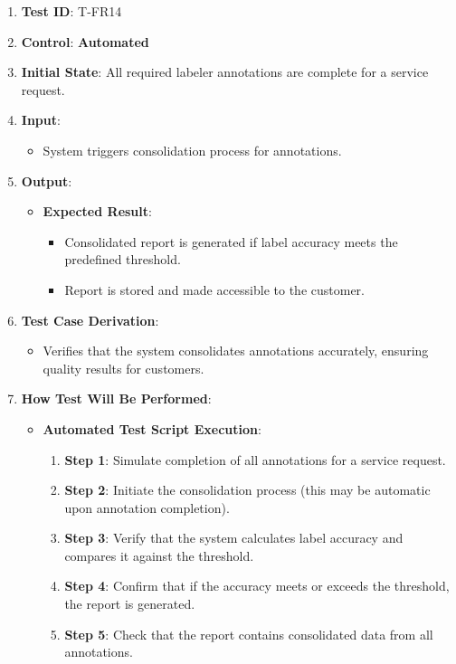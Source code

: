 \documentclass[12pt, titlepage]{article}
\begin{document}
\begin{enumerate}
    \item \textbf{Test ID}: T-FR14
    \item \textbf{Control}: \textbf{Automated}
    \item \textbf{Initial State}: All required labeler annotations are complete for a service request.
    \item \textbf{Input}:
    \begin{itemize}
        \item System triggers consolidation process for annotations.
    \end{itemize}
    \item \textbf{Output}:
    \begin{itemize}
        \item \textbf{Expected Result}:
        \begin{itemize}
            \item Consolidated report is generated if label accuracy meets the predefined threshold.
            \item Report is stored and made accessible to the customer.
        \end{itemize}
    \end{itemize}
    \item \textbf{Test Case Derivation}:
    \begin{itemize}
        \item Verifies that the system consolidates annotations accurately, ensuring quality results for customers.
    \end{itemize}
    \item \textbf{How Test Will Be Performed}:
    \begin{itemize}
        \item \textbf{Automated Test Script Execution}:
        \begin{enumerate}
            \item \textbf{Step 1}: Simulate completion of all annotations for a service request.
            \item \textbf{Step 2}: Initiate the consolidation process (this may be automatic upon annotation completion).
            \item \textbf{Step 3}: Verify that the system calculates label accuracy and compares it against the threshold.
            \item \textbf{Step 4}: Confirm that if the accuracy meets or exceeds the threshold, the report is generated.
            \item \textbf{Step 5}: Check that the report contains consolidated data from all annotations.

\end{enumerate}
\end{itemize}
\end{enumerate}
\end{document}
